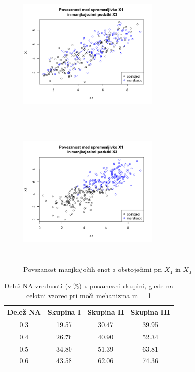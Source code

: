 \documentclass[12pt,a4paper]{article}
\begin{document}
\begin{figure}[ht]
	\centering
	\begin{minipage}[b]{.5\linewidth}	
		\centering
		\includegraphics[width= 7cm, height = 7cm]{img/NMAR_moc_1.png}
		\label{fig:2a}
	\end{minipage}%
	\begin{minipage}[b]{.5\linewidth}
		\centering
		\includegraphics[width= 7cm, height = 7cm]{img/NMAR_moc_12.png}
		\label{fig:2b}
	\end{minipage}
	\caption{Povezanost manjkajočih enot z obstoječimi pri $X_1$ in $X_3$}
	\label{fig:2}
\end{figure}


\begin{table}[ht]
	\centering
	\begin{tabular}{cccc}
		Delež NA & Skupina I & Skupina II  &  Skupina III  \\
		\hline
      0.3 & 19.57 & 30.47 & 39.95\\
      0.4 & 26.76 & 40.90 & 52.34\\
      0.5 & 34.80 & 51.39 & 63.81\\
      0.6 & 43.58 & 62.06 & 74.36\\
	\end{tabular}
	\caption{Delež NA vrednosti (v \%) v posamezni skupini, glede na celotni vzorec pri moči mehanizma m = 1}
	\label{tab:3}
\end{table}
\end{document}
